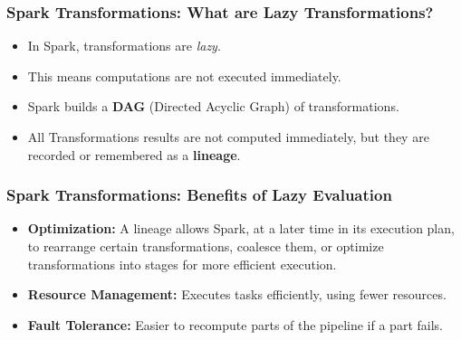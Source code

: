 \begin{frame}
    \frametitle{Spark Transformations: What are Lazy Transformations?}
    \begin{itemize}
        \item In Spark, transformations are \textit{lazy}.
        \item This means computations are not executed immediately.
        \item Spark builds a \textbf{DAG} (Directed Acyclic Graph) of transformations.
        \item All Transformations results are not computed immediately, but they are recorded or remembered as a \textbf{lineage}.
    \end{itemize}
\end{frame}

\begin{frame}
    \frametitle{Spark Transformations: Benefits of Lazy Evaluation}
    \begin{itemize}
        \item \textbf{Optimization:} A lineage allows Spark, at a later time in its execution plan, to rearrange certain transformations, coalesce
        them, or optimize transformations into stages for more efficient execution.
        \item \textbf{Resource Management:} Executes tasks efficiently, using fewer resources.
        \item \textbf{Fault Tolerance:} Easier to recompute parts of the pipeline if a part fails.
    \end{itemize}
\end{frame}

